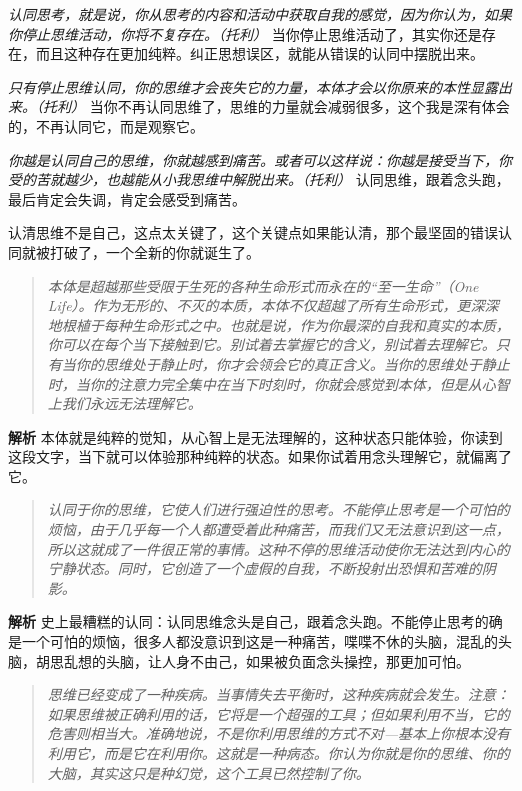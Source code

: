 \textit{认同思考，就是说，你从思考的内容和活动中获取自我的感觉，因为你认为，如果你停止思维活动，你将不复存在。（托利）} 当你停止思维活动了，其实你还是存在，而且这种存在更加纯粹。纠正思想误区，就能从错误的认同中摆脱出来。

\textit{只有停止思维认同，你的思维才会丧失它的力量，本体才会以你原来的本性显露出来。（托利）} 当你不再认同思维了，思维的力量就会减弱很多，这个我是深有体会的，不再认同它，而是观察它。

\textit{你越是认同自己的思维，你就越感到痛苦。或者可以这样说：你越是接受当下，你受的苦就越少，也越能从小我思维中解脱出来。（托利）} 认同思维，跟着念头跑，最后肯定会失调，肯定会感受到痛苦。

认清思维不是自己，这点太关键了，这个关键点如果能认清，那个最坚固的错误认同就被打破了，一个全新的你就诞生了。

\begin{quote}\it
    本体是超越那些受限于生死的各种生命形式而永在的“至一生命”（One Life）。作为无形的、不灭的本质，本体不仅超越了所有生命形式，更深深地根植于每种生命形式之中。也就是说，作为你最深的自我和真实的本质，你可以在每个当下接触到它。别试着去掌握它的含义，别试着去理解它。只有当你的思维处于静止时，你才会领会它的真正含义。当你的思维处于静止时，当你的注意力完全集中在当下时刻时，你就会感觉到本体，但是从心智上我们永远无法理解它。
\end{quote}

\textbf{解析} 本体就是纯粹的觉知，从心智上是无法理解的，这种状态只能体验，你读到这段文字，当下就可以体验那种纯粹的状态。如果你试着用念头理解它，就偏离了它。

\begin{quote}\it
    认同于你的思维，它使人们进行强迫性的思考。不能停止思考是一个可怕的烦恼，由于几乎每一个人都遭受着此种痛苦，而我们又无法意识到这一点，所以这就成了一件很正常的事情。这种不停的思维活动使你无法达到内心的宁静状态。同时，它创造了一个虚假的自我，不断投射出恐惧和苦难的阴影。
\end{quote}

\textbf{解析} 史上最糟糕的认同：认同思维念头是自己，跟着念头跑。不能停止思考的确是一个可怕的烦恼，很多人都没意识到这是一种痛苦，喋喋不休的头脑，混乱的头脑，胡思乱想的头脑，让人身不由己，如果被负面念头操控，那更加可怕。

\begin{quote}\it
    思维已经变成了一种疾病。当事情失去平衡时，这种疾病就会发生。注意：如果思维被正确利用的话，它将是一个超强的工具；但如果利用不当，它的危害则相当大。准确地说，不是你利用思维的方式不对—基本上你根本没有利用它，而是它在利用你。这就是一种病态。你认为你就是你的思维、你的大脑，其实这只是种幻觉，这个工具已然控制了你。
\end{quote}

